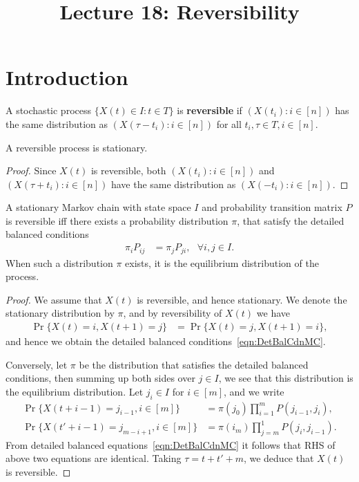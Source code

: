 \documentclass[a4paper,10pt,english]{article}
\title{Lecture 18: Reversibility}
\author{}
\begin{document}
\maketitle

\section{Introduction}
A stochastic process $\{X(t) \in I: t \in T\}$ is \textbf{reversible} if $(X(t_i): i \in [n])$ has the same distribution as $(X(\tau-t_i): i \in [n])$ for all $t_i, \tau \in T, i \in [n]$.
\begin{lem} 
A reversible process is stationary.
\end{lem}
\begin{proof}
Since $X(t)$ is reversible, both $(X(t_i): i\in [n])$ and $(X(\tau+t_i): i \in [n])$ have the same distribution as $(X(-t_i): i \in [n])$.
\end{proof}
\begin{thm} 
\label{thm:characterization1}
A stationary Markov chain with state space $I$ and probability transition matrix $P$ is reversible iff there exists a probability distribution $\pi$, that satisfy the detailed balanced conditions
\begin{align}
\label{eqn:DetBalCdnMC}
\pi_iP_{ij} &= \pi_jP_{ji},~~~ \forall i,j \in I.
\end{align}
When such a distribution $\pi$ exists, it is the equilibrium distribution of the process.
\end{thm}
\begin{proof} We assume that $X(t)$ is reversible, and hence stationary. We denote the stationary distribution by $\pi$, and by reversibility of $X(t)$ we have
\begin{align*}
\Pr\{X(t) = i , X(t+1) = j\} &= \Pr\{X(t) = j, X(t+1) = i\},
\end{align*}
and hence we obtain the detailed balanced conditions~\eqref{eqn:DetBalCdnMC}. 

Conversely, let $\pi$ be the distribution that satisfies the detailed balanced conditions, then
summing up both sides over $j \in I$, we see that this distribution is the equilibrium distribution.
Let $j_i \in I$ for $i \in [m]$, and we write
\begin{align*}
\Pr\{X(t+i-1) = j_{i-1}, i \in [m]\} &= \pi(j_0)\prod_{i=1}^mP(j_{i-1},j_{i}),\\
\Pr\{X(t'+i-1) = j_{m-i+1}, i \in [m]\} &= \pi(i_m)\prod_{j=m}^{1}P(j_i,j_{i-1}).
\end{align*}
From detailed balanced equations~\eqref{eqn:DetBalCdnMC} it follows that RHS of above two equations are identical. Taking $\tau = t+t'+m$, we deduce that $X(t)$ is reversible.
\end{proof}
\end{document}
